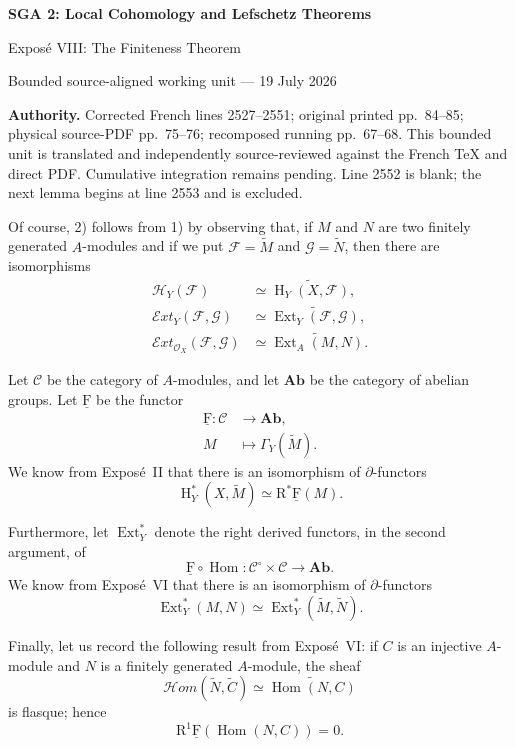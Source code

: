 \documentclass[10pt,a4paper]{article}
\newcommand{\OX}{\mathcal O_X}
\newcommand{\Ab}{\mathbf{Ab}}
\newcommand{\CatC}{\mathcal C}
\newcommand{\cF}{\underline{\mathrm F}}
\newcommand{\Hloc}{\operatorname H}
\newcommand{\Ext}{\operatorname{Ext}}
\newcommand{\SheafExt}{\mathcal E\!xt}
\newcommand{\SheafHom}{\mathcal H\!om}
\newcommand{\SheafH}{\mathcal H}
\newcommand{\R}{\mathrm R}
\begin{document}
\begin{center}
  {\Large\bfseries SGA 2: Local Cohomology and Lefschetz Theorems}\par\smallskip
  {\large Expos\'e VIII: The Finiteness Theorem}\par
  \small Bounded source-aligned working unit --- 19 July 2026
\end{center}
\noindent\colorbox{softgray}{\parbox{0.95\linewidth}{\footnotesize\textbf{Authority.}
Corrected French lines 2527--2551; original printed pp.~84--85; physical
source-PDF pp.~75--76; recomposed running pp.~67--68. This bounded unit is
translated and independently source-reviewed against the French TeX and direct
PDF. Cumulative integration remains pending. Line 2552 is blank; the next
lemma begins at line 2553 and is excluded.}}

Of course, 2) follows from 1) by observing that, if $M$ and $N$ are two
finitely generated $A$-modules and if we put $\mathcal F=\widetilde M$ and
$\mathcal G=\widetilde N$, then there are isomorphisms
\begin{align*}
  \SheafH_Y(\mathcal F)
    &\simeq \widetilde{\Hloc_Y(X,\mathcal F)}, \\
  \SheafExt_Y(\mathcal F,\mathcal G)
    &\simeq \widetilde{\Ext_Y(\mathcal F,\mathcal G)}, \\
  \SheafExt_{\OX}(\mathcal F,\mathcal G)
    &\simeq \widetilde{\Ext_A(M,N)}.
\end{align*}

Let $\CatC$ be the category of $A$-modules, and let $\Ab$ be the category of
abelian groups. Let $\cF$ be the functor
\[
  \begin{aligned}
    \cF\colon \CatC &\longrightarrow \Ab, \\
    M &\longmapsto \Gamma_Y(\widetilde M).
  \end{aligned}
\]
We know from Expos\'e~II that there is an isomorphism of $\partial$-functors
\[
  \Hloc_Y^*(X,\widetilde M)\simeq \R^*\cF(M).
\]

Furthermore, let $\Ext_Y^*$ denote the right derived functors, in the second
argument, of
\[
  \cF\circ\operatorname{Hom}\colon \CatC^{\circ}\times\CatC\longrightarrow\Ab.
\]
We know from Expos\'e~VI that there is an isomorphism of $\partial$-functors
\[
  \Ext_Y^*(M,N)\simeq \Ext_Y^*(\widetilde M,\widetilde N).
\]

Finally, let us record the following result from Expos\'e~VI: if $C$ is an
injective $A$-module and $N$ is a finitely generated $A$-module, the sheaf
\[
  \SheafHom(\widetilde N,\widetilde C)
    \simeq \widetilde{\operatorname{Hom}(N,C)}
\]
is flasque; hence
\[
  \R^1\cF(\operatorname{Hom}(N,C))=0.
\]
\end{document}
